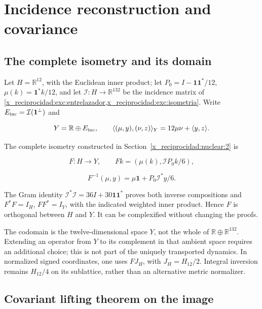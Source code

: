 \chapter{Incidence reconstruction and covariance}
\label{x_reciprocidad:nuclear:5}
\section{The complete isometry and its domain}\label{x_reciprocidad:nuc05:isometria}

Let \(H=\mathbb R^{12}\), with the Euclidean inner product; let \(P_0=I-\mathbf1\mathbf1^*/12\), \(\mu(k)=\mathbf1^*k/12\), and let \(\mathcal I:H\to\mathbb R^{132}\) be the incidence matrix of \cref{x_reciprocidad:exc:entrelazador,x_reciprocidad:exc:isometria}. Write \(E_{\rm inc}=\mathcal I(\mathbf1^\perp)\) and

\[
Y=\mathbb R\oplus E_{\rm inc},\qquad
\langle(\mu,y),(\nu,z)\rangle_Y=12\mu\nu+\langle y,z\rangle.
\]

The complete isometry constructed in Section~\ref{x_reciprocidad:nuclear:2} is

\[
F:H\longrightarrow Y,\qquad Fk=(\mu(k),\mathcal I P_0k/6),
\]

\[
F^{-1}(\mu,y)=\mu\mathbf1+P_0\mathcal I^*y/6.
\]

The Gram identity \(\mathcal I^*\mathcal I=36I+30\mathbf1\mathbf1^*\) proves both inverse compositions and \(F^*F=I_H\), \(FF^*=I_Y\), with the indicated weighted inner product. Hence \(F\) is orthogonal between \(H\) and \(Y\). It can be complexified without changing the proofs.

The codomain is the twelve-dimensional space \(Y\), not the whole of \(\mathbb R\oplus\mathbb R^{132}\). Extending an operator from \(Y\) to its complement in that ambient space requires an additional choice; this is not part of the uniquely transported dynamics. In normalized signed coordinates, one uses \(FJ_H\), with \(J_H=H_{12}/2\). Integral inversion remains \(H_{12}/4\) on its sublattice, rather than an alternative metric normalizer.

\section{Covariant lifting theorem on the image}\label{x_reciprocidad:nuc05:levantamiento}

